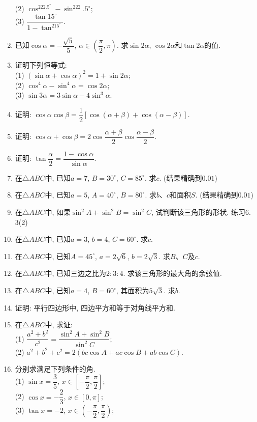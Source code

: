 \documentclass[10pt,a4paper]{article}
\begin{document}
\begin{enumerate}[1.]
(2) $\cos^222.5^\circ -\sin^222. 5^\circ$;\\
(3) $\dfrac{\tan 15^\circ}{1-\tan^215^\circ}$.
\item 已知$\cos \alpha=-\dfrac{\sqrt 5}5$, $\alpha\in (\dfrac\pi 2, \pi)$. 求$\sin 2\alpha$, $\cos 2\alpha$和$\tan 2\alpha$的值.
\item 证明下列恒等式:\\
(1) $(\sin \alpha+\cos \alpha)^2=1+\sin 2\alpha$;\\
(2) $\cos^4\alpha-\sin^4\alpha=\cos 2\alpha$;\\
(3) $\sin 3\alpha=3\sin \alpha-4\sin^3\alpha$.
\item 证明: $\cos \alpha\cos \beta=\dfrac 12[\cos (\alpha+\beta)+\cos (\alpha-\beta)]$.
\item 证明: $\cos \alpha+\cos \beta=2\cos \dfrac{\alpha+\beta}
2 \cos \dfrac{\alpha-\beta}2$.
\item 证明: $\tan \dfrac\alpha2=\dfrac{1-\cos \alpha}{\sin \alpha}$.
\item 在$\triangle ABC$中, 已知$a=7$, $B=30^\circ$, $C=85^\circ$. 求$c$. (结果精确到$0. 01$)
\item 在$\triangle ABC$中, 已知$a=5$, $A=40^\circ$, $B=80^\circ$. 求$b$、$c$和面积$S$. (结果精确到$0. 01$)
\item 在$\triangle ABC$中, 如果$\sin^2A+\sin^2B=\sin^2C$, 试判断该三角形的形状. 
练习6. 3(2)
\item 在$\triangle ABC$中, 已知$a=3$, $b=4$, $C=60^\circ$. 求$c$.
\item 在$\triangle ABC$中, 已知$A=45^\circ$, $a=2\sqrt 6$, $b=2\sqrt 3$. 求$B$、$C$及$c$.
\item 在$\triangle ABC$中, 已知三边之比为$2:3:4$. 求该三角形的最大角的余弦值.
\item 在$\triangle ABC$中, 已知$a=4$, $B=60^\circ$, 其面积为$5\sqrt 3$. 求$b$.
\item 证明: 平行四边形中, 四边平方和等于对角线平方和.
\item 在$\triangle ABC$中, 求证:\\
(1) $\dfrac{a^2+b^2}{c^2}=\dfrac{\sin^2A+\sin^2B}{\sin^2C}$;\\
(2) $a^2+b^2+c^2=2(bc\cos A+ac\cos B+ab\cos C)$.
\item 分别求满足下列条件的角.\\
(1) $\sin x=\dfrac 35$, $x\in  [-\dfrac\pi 2, \dfrac\pi 2]$;\\
(2) $\cos x=-\dfrac 23$, $x\in [0, \pi ]$;\\
(3) $\tan x=-2$, $x\in (-\dfrac\pi 2, \dfrac\pi 2)$;\\

\end{enumerate}
\end{document}
